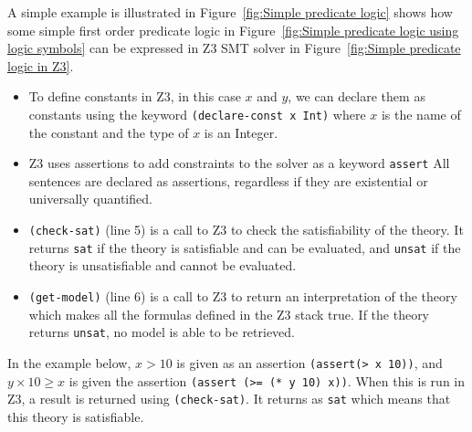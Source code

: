 \documentclass[a4paper]{report}
\begin{document}
A simple example is illustrated in Figure~\ref{fig:Simple predicate logic} shows how some simple first order predicate logic in Figure~\ref{fig:Simple predicate logic using logic symbols} can be expressed in Z3 SMT solver in  Figure~\ref{fig:Simple predicate logic in Z3}.
\begin{itemize}
\item To define constants in Z3, in this case $x$ and $y$, we can declare them as constants using the keyword \texttt{(declare-const x Int)} where $x$ is the name of the constant and the type of $x$ is an Integer.
\item Z3 uses assertions to add constraints to the solver as a keyword \texttt{assert} All sentences are declared as assertions, regardless if they are existential or universally quantified. 
\item \texttt{(check-sat)} (line 5) is a call to Z3 to check the satisfiability of the theory. It returns \texttt{sat} if the theory is satisfiable and can be evaluated, and \texttt{unsat} if the theory is unsatisfiable and cannot be evaluated.
\item \texttt{(get-model)} (line 6) is a call to Z3 to return an interpretation of the theory which makes all the formulas defined in the Z3 stack true. If the theory returns \texttt{unsat}, no model is able to be retrieved.  
\end{itemize}

In the example below, $x > 10$ is given as an assertion \texttt{(assert(> x 10))}, and $y \times 10 \geq x$ is given the assertion \texttt{(assert (>= (* y 10) x))}. When this is run in Z3, a result is returned using  \texttt{(check-sat)}. It returns as \texttt{sat} which means that this theory is satisfiable.\\ 
\end{document}
